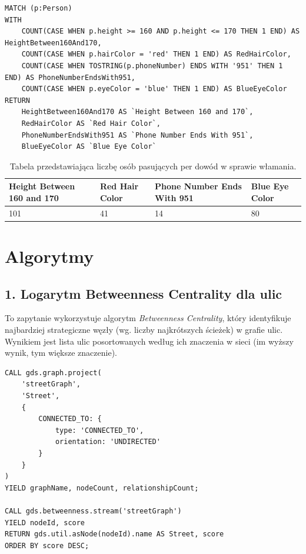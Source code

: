 \documentclass[a4paper,12pt]{article}
\begin{document}
\begin{center}
\begin{minipage}{0.8\linewidth}
\begin{lstlisting}[language=Cypher, basicstyle=\small, breaklines=true]
MATCH (p:Person)
WITH
    COUNT(CASE WHEN p.height >= 160 AND p.height <= 170 THEN 1 END) AS HeightBetween160And170,
    COUNT(CASE WHEN p.hairColor = 'red' THEN 1 END) AS RedHairColor,
    COUNT(CASE WHEN TOSTRING(p.phoneNumber) ENDS WITH '951' THEN 1 END) AS PhoneNumberEndsWith951,
    COUNT(CASE WHEN p.eyeColor = 'blue' THEN 1 END) AS BlueEyeColor
RETURN 
    HeightBetween160And170 AS `Height Between 160 and 170`, 
    RedHairColor AS `Red Hair Color`, 
    PhoneNumberEndsWith951 AS `Phone Number Ends With 951`,
    BlueEyeColor AS `Blue Eye Color`
\end{lstlisting}
\end{minipage}
\end{center}

\begin{table}[h!]
\centering
\begin{tabular}{|p{4cm}|p{4cm}|p{4cm}|p{4cm}|}
\hline
\textbf{Height Between 160 and 170} & \textbf{Red Hair Color} & \textbf{Phone Number Ends With 951} & \textbf{Blue Eye Color} \\
\hline
101 & 41 & 14 & 80 \\
\hline
\end{tabular}
\caption{Tabela przedstawiająca liczbę osób pasujących per dowód w sprawie włamania.}
\label{tab:criteria_counts}
\end{table}

\newpage

\section{Algorytmy}

\subsection*{1. Logarytm Betweenness Centrality dla ulic}
To zapytanie wykorzystuje algorytm \textit{Betweenness Centrality}, który identyfikuje najbardziej strategiczne węzły (wg. liczby najkrótszych ścieżek) w grafie ulic. Wynikiem jest lista ulic posortowanych według ich znaczenia w sieci (im wyższy wynik, tym większe znaczenie).
\begin{verbatim}
CALL gds.graph.project(
    'streetGraph',
    'Street',
    {
        CONNECTED_TO: {
            type: 'CONNECTED_TO',
            orientation: 'UNDIRECTED'
        }
    }
)
YIELD graphName, nodeCount, relationshipCount;

CALL gds.betweenness.stream('streetGraph') 
YIELD nodeId, score
RETURN gds.util.asNode(nodeId).name AS Street, score
ORDER BY score DESC;
\end{verbatim}
\end{document}
